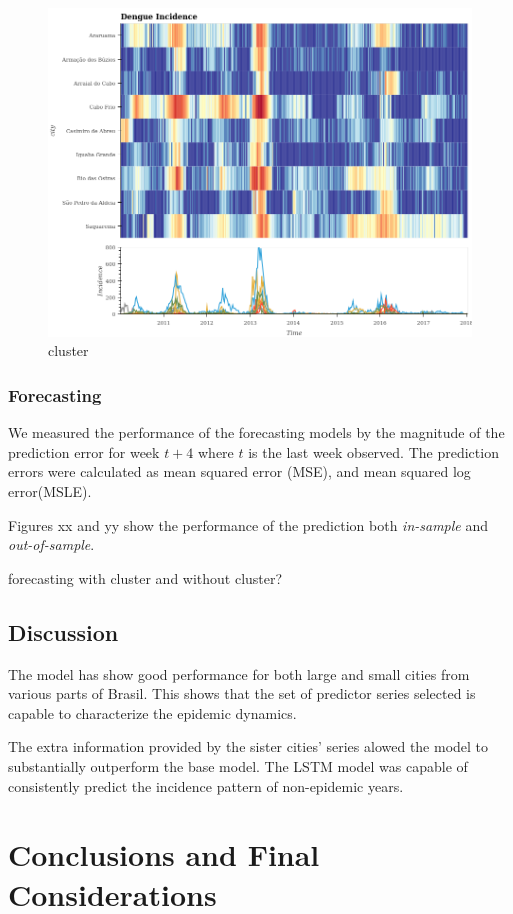 \documentclass[12pt]{report}
\begin{document}
\begin{figure}[h]
 \centering
 \includegraphics[scale=0.4]{./cluster_3300209.png}
 \caption{cluster}
\end{figure}

\subsection{Forecasting}
We measured the performance of the forecasting models by the magnitude of the prediction error for week $t+4$ where $t$ is the last week observed. The prediction errors were calculated as mean squared error (MSE), and mean squared log error(MSLE).

Figures xx and yy show the performance of the prediction  both \emph{in-sample} 
and  \emph{out-of-sample}.

forecasting with cluster and without cluster?

\section{Discussion}

The model has show good performance for both large and small cities from various parts of Brasil. This shows that the set of predictor series selected is capable to characterize the epidemic dynamics.

The extra information provided by the sister cities' series alowed the model to substantially outperform the base model. The LSTM model was capable of consistently predict the incidence pattern of non-epidemic years. 

\newpage
\chapter{Conclusions and Final Considerations}

\newpage
{}
{}



\newpage
{}
{}
\end{document}
